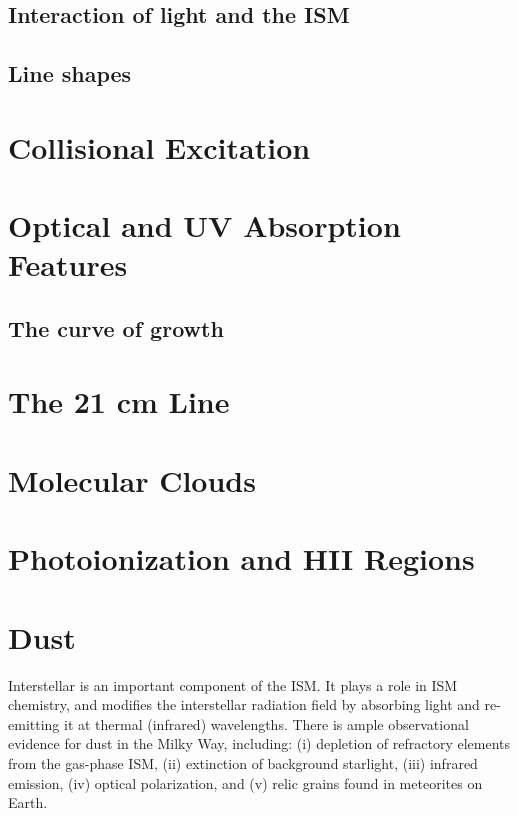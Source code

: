 \subsection{Interaction of light and the ISM}

\subsection{Line shapes}


\section{Collisional Excitation} \label{sec:ism-collisional}


\section{Optical and UV Absorption Features} \label{sec:ism-absorption}
\subsection{The curve of growth}


\section{The 21 cm Line} \label{sec:ism-21cm}


\section{Molecular Clouds} \label{sec:ism-clouds}


\section{Photoionization and HII Regions} \label{sec:ism-photoionization}


\section{Dust} \label{sec:ism-dust}
Interstellar  is an important component of the ISM. It plays a role in ISM chemistry, and modifies the interstellar radiation field by absorbing light and re-emitting it at thermal (infrared) wavelengths. There is ample observational evidence for dust in the Milky Way, including: (i) depletion of refractory elements from the gas-phase ISM, (ii) extinction of background starlight, (iii) infrared emission, (iv) optical polarization, and (v) relic grains found in meteorites on Earth.

